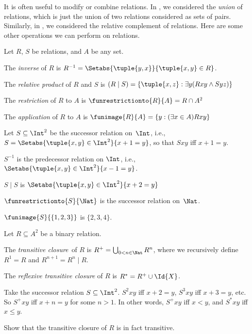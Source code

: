 \documentclass[../../../include/open-logic-section]{subfiles}
\begin{document}

It is often useful to modify or combine relations. In , we considered 
the \emph{union} of relations, which is just the union of two relations
considered as sets of pairs. Similarly, in , we considered the relative complement of relations. Here are some other operations we can perform on relations.
\begin{defn} Let $R$, $S$ be relations, and $A$ be any set. 

The \emph{inverse} of $R$ is $R^{-1} = \Setabs{\tuple{y,
    x}}{\tuple{x, y} \in R}$.

The \emph{relative product} of $R$ and $S$ is
$(R \mid S) = \{\tuple{x, z} : \exists y(Rxy \land Syz)\}$

The \emph{restriction} of $R$ to $A$ is $\funrestrictionto{R}{A}= R \cap A^2$

The \emph{application} of $R$ to $A$ is 
$\funimage{R}{A} = \{y : (\exists x \in A)Rxy\}$
\end{defn}

\begin{ex}
Let $S \subseteq \Int^2$ be the successor relation on~$\Int$, i.e.,
$S = \Setabs{\tuple{x, y} \in \Int^2}{x + 1 = y}$, so that $Sxy$ iff $x + 1 = y$.

	$S^{-1}$ is the predecessor relation on $\Int$, i.e.,
  $\Setabs{\tuple{x,y}\in\Int^2}{x -1 =y}$.
  
  $S\mid S$ is 
  $ \Setabs{\tuple{x,y}\in\Int^2}{x + 2 =y}$

	$\funrestrictionto{S}{\Nat}$ is the successor relation
  on~$\Nat$.

	$\funimage{S}{\{1,2,3\}}$ is $\{2,
  3, 4\}$.
\end{ex}

\begin{defn}Let $R \subseteq A^2$ be a binary relation. 
	
The \emph{transitive closure}~of  $R$ is
$R^+ = \bigcup_{0 < n \in \Nat} R^n$, where we recursively define $R^1 = R$ and $R^{n+1} = R^n
\mid R$.

The \emph{reflexive transitive closure} of $R$ is $R^* = R^+ \cup
\Id{X}$.
\end{defn}

\begin{ex}
Take the successor relation $S \subseteq \Int^2$. $S^2xy$ iff $x + 2 =
y$, $S^3xy$ iff $x + 3 = y$, etc. So $S^+xy$ iff $x + n = y$ for some $n > 1$. In other words, $S^+xy$ iff $x < y$,  and $S^*xy$ iff $x \le y$.
\end{ex}

\begin{prob}
Show that the transitive closure of $R$ is in fact transitive.
\end{prob}
\end{document}
